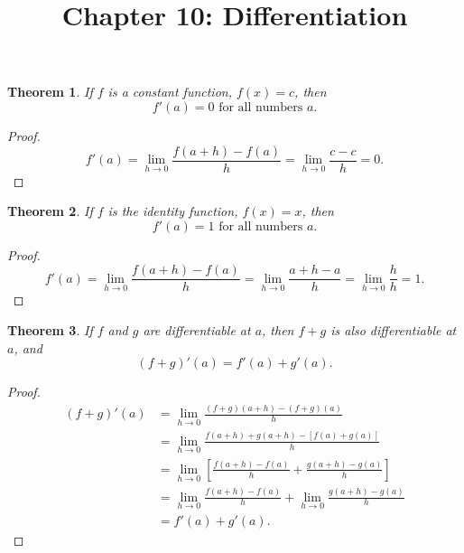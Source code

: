 \documentclass{article}
\newtheorem{theorem}{Theorem}
\begin{document}
\title{Chapter 10: Differentiation}
\maketitle

\begin{theorem}
  If $f$ is a constant function, $f(x) = c$, then \begin{equation*}
    f'(a) = 0 \text{ for all numbers } a.
  \end{equation*}
\end{theorem}

\begin{proof}
  \begin{equation*}
    f'(a) = \lim_{h \rightarrow 0}\frac{f(a + h) - f(a)}{h} = \lim_{h
      \rightarrow 0}\frac{c - c}{h} = 0.
  \end{equation*}
\end{proof}

\begin{theorem}
  If $f$ is the identity function, $f(x) = x$, then \begin{equation*}
    f'(a) = 1 \text{ for all numbers } a.
  \end{equation*}
\end{theorem}

\begin{proof}
  \begin{equation*}
    f'(a) = \lim_{h \rightarrow 0}\frac{f(a + h) - f(a)}{h} = \lim_{h
      \rightarrow 0}\frac{a + h - a}{h} = \lim_{h \rightarrow 0}\frac{h}{h} =
      1.
  \end{equation*}
\end{proof}

\begin{theorem}
  If $f$ and $g$ are differentiable at $a$, then $f + g$ is also differentiable
  at $a$, and \begin{equation*}
    (f + g)'(a) = f'(a) + g'(a).
  \end{equation*}
\end{theorem}

\begin{proof}
  \begin{align*}
    (f + g)'(a) &= \lim_{h \rightarrow 0}\frac{(f + g)(a + h) - (f + g)(a)}{h}
      \\
      &= \lim_{h \rightarrow 0}\frac{f(a + h) + g(a + h) - [f(a) + g(a)]}{h} \\
      &= \lim_{h \rightarrow 0}{\left[\frac{f(a + h) - f(a)}{h} + \frac{g(a +
        h) - g(a)}{h}\right]} \\
      &= \lim_{h \rightarrow 0}\frac{f(a + h) - f(a)}{h} + \lim_{h \rightarrow
        0}\frac{g(a + h) - g(a)}{h} \\
      &= f'(a) + g'(a).
  \end{align*}
\end{proof}
\end{document}
